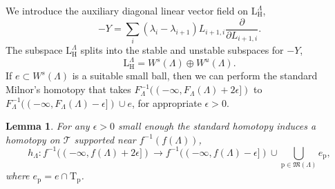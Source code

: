 \documentclass[reqno]{amsart}
\newcommand{\p}{\mathrm{p}}
\newcommand{\cT}{\mathcal{T}}
\newcommand{\T}{\mathbb{T}}
\renewcommand{\L}{\mathrm{L}}
\renewcommand{\T}{\mathrm{T}}
\renewcommand{\H}{\mathrm{H}}
\newtheorem{lemma}[theorem]{Lemma}
\begin{document}
We introduce the auxiliary diagonal linear  vector field on $\L^\Lambda_\H$,
\[-Y=\sum_i (\lambda_{i}-\lambda_{i+1})L_{i+1,i}\frac{\partial}{\partial L_{i+1,i}}.\]
The subspace $\L^\Lambda_\H$ splits into the stable and unstable subspaces for $-Y$,
\[\L^\Lambda_\H=W^s(\Lambda)\oplus W^u(\Lambda).\]
If $e\subset W^s(\Lambda)$ is a suitable small ball, then we can perform the standard Milnor's homotopy  that takes $F_\Lambda^{-1}((-\infty,F_\Lambda(\Lambda)+2\epsilon])$ to  $F_\Lambda^{-1}((-\infty,F_\Lambda(\Lambda)-\epsilon])\cup e$, for appropriate $\epsilon>0$.

\begin{lemma}\label{lem:Milnor} For any $\epsilon>0$ small enough  the standard homotopy induces  a homotopy on $\cT$ supported near $f^{-1}(f(\Lambda))$,
\begin{equation}\label{eq:standard-homotopy}
  h_\Lambda:f^{-1}((-\infty, f(\Lambda)+2\epsilon])\to f^{-1}((-\infty, f(\Lambda)-\epsilon])\cup \bigcup_{\p\in \mathfrak{M}(\Lambda)}e_{\p},
\end{equation}
where $e_{\p}=e\cap \T_{\p}$.
\end{lemma}
\end{document}
